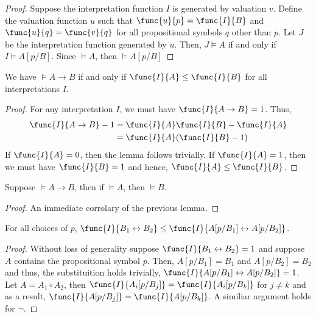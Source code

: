 \begin{proof}
    Suppose the interpretation function \(I\) is generated by valuation \(v\). Define the valuation function \(u\) such that \(\func{u}{p} = \func{I}{B}\) and \(\func{u}{q} = \func{v}{q}\) for all propositional symbols \(q\) other than \(p\). Let \(J\) be the interpretation function generated by \(u\). Then, \(J \models A\) if and only if \(I \models A[p/B]\). Since \(\models A\), then \( \models A[p/B]\)
\end{proof}

\begin{lemma}
    We have \(\models A \to B\) if and only if \(\func{I}{A} \leq \func{I}{B}\) for all interpretations \(I\).
\end{lemma}

\begin{proof}
    For any interpretation \(I\), we must have \(\func{I}{A \to B} = 1\). Thus,
    \begin{align}
        \func{I}{A \to B} - 1 &= \func{I}{A} \func{I}{B} - \func{I}{A}\\
        &= \func{I}{A}(\func{I}{B} -1)
    \end{align}
    If \(\func{I}{A} = 0\), then the lemma follows trivially. If \(\func{I}{A} =1\), then we must have \(\func{I}{B} = 1\) and hence, \(\func{I}{A}\leq \func{I}{B}\).
\end{proof}

\begin{lemma}
    Suppose \(\models A \to B\), then if \(\models A\), then \(\models B\). 
\end{lemma}
\begin{proof}
    An immediate corrolary of the previous lemma.
\end{proof}

\begin{lemma}
    For all choices of \(p\), \(\func{I}{B_1 \leftrightarrow B_2} \leq \func{I}{A[p/B_1] \leftrightarrow A[p/B_2]}\).
\end{lemma}

\begin{proof}
    Without loss of generality suppose \(\func{I}{B_1 \leftrightarrow B_2} = 1\) and suppose \(A\) contains the propositional symbol \(p\). Then, \(A[p/B_1] = B_1\) and \(A[p/B_2] = B_2\) and thus, the substituition holds trivially, \(\func{I}{A[p/B_1] \leftrightarrow A[p/B_2]} = 1\).  Let \(A = A_1 \circ A_2\), then \(\func{I}{A_i[p/B_j]} = \func{I}{A_i[p/B_k]}\) for \(j\neq k\) and as a result, \(\func{I}{A[p/B_j]} = \func{I}{A[p/B_k]}\). A similiar argument holds for \(\neg\). 
\end{proof}

